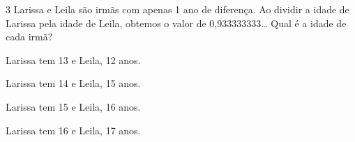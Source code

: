 










\num{3} Larissa e Leila são irmãs com apenas 1 ano de diferença. Ao dividir a
idade de Larissa pela idade de Leila, obtemos o valor de
0,933333333\ldots{} Qual é a idade de cada irmã?
\item Larissa tem 13 e Leila, 12 anos.
\item Larissa tem 14 e Leila, 15 anos.
\item Larissa tem 15 e Leila, 16 anos.
\item Larissa tem 16 e Leila, 17 anos.





